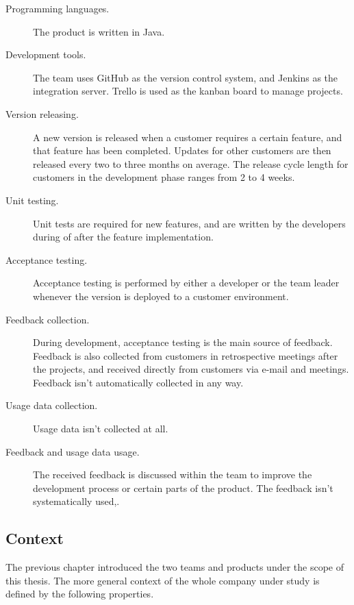 \documentclass[english]{tktltiki2}
\theoremstyle{definition}
\theoremstyle{remark}
\begin{document}
\begin{description}
  \item[Programming languages.] The product is written in Java.
  \item[Development tools.] The team uses GitHub as the version control system, and Jenkins as the integration server. Trello is used as the kanban board to manage projects. 
  \item[Version releasing.] A new version is released when a customer requires a certain feature, and that feature has been completed. Updates for other customers are then released every two to three months on average. The release cycle length for customers in the development phase ranges from 2 to 4 weeks. 
  \item[Unit testing.] Unit tests are required for new features, and are written by the developers during of after the feature implementation.
  \item[Acceptance testing.] Acceptance testing is performed by either a developer or the team leader whenever the version is deployed to a customer environment.
  \item[Feedback collection.] During development, acceptance testing is the main source of feedback. Feedback is also collected from customers in retrospective meetings after the projects, and received directly from customers via e-mail and meetings. Feedback isn't automatically collected in any way.
  \item[Usage data collection.] Usage data isn't collected at all.
  \item[Feedback and usage data usage.] The received feedback is discussed within the team to improve the development process or certain parts of the product. The feedback isn't systematically used,. 
\end{description}

\subsection{Context} %

The previous chapter introduced the two teams and products under the scope of this thesis. The more general context of the whole company under study is defined by the following properties. 
\end{document}

